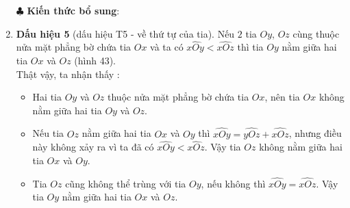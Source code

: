 \begin{enumerate}
	
	$\clubsuit$ \textbf{Kiến thức bổ sung}:
	\item \textbf{Dấu hiệu 5} (dấu hiệu T5 - về thứ tự của tia). Nếu $2$ tia $Oy$, $Oz$ cùng thuộc nửa mặt phẳng bờ chứa tia $Ox$ và ta có $\widehat{xOy}<\widehat{xOz}$ thì tia $Oy$ nằm giữa hai tia $Ox$ và $Oz$ (hình 43).\\
	Thật vậy, ta nhận thấy :
	\begin{itemize}
		\item Hai tia $Oy$ và $Oz$ thuộc nửa mặt phẳng bờ chứa tia $Ox$, nên tia $Ox$ không nằm giữa hai tia $Oy$ và $Oz$. 
		\item Nếu tia $Oz$ nằm giữa hai tia $Ox$ và $Oy$ thì $\widehat{xOy}=\widehat{yOz}+\widehat{xOz}$, nhưng điều này không xảy ra vì ta đã có $\widehat{xOy}<\widehat{xOz}$. Vậy tia $Oz$ không nằm giữa hai tia $Ox$ và $Oy$.
		\item Tia $Oz$ cũng không thể trùng với tia $Oy$, nếu không thì $\widehat{xOy}=\widehat{xOz}$. Vậy tia $Oy$ nằm giữa hai tia $Ox$ và $Oz$.
	\end{itemize}
\end{enumerate}
